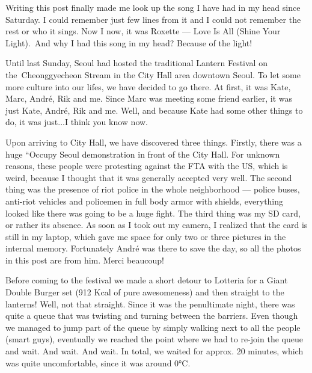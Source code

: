 \begin{post}
	\begin{content}
Writing this post finally made me look up the song I have had in my head since Saturday. I could remember just few lines from it and I could not remember the rest or who it sings. Now I now, it was Roxette — Love Is All (Shine Your Light). And why I had this song in my head? Because of the light!

\begin{figure}[h]
\centering
{}
\end{figure}

Until last Sunday, Seoul had hosted the traditional Lantern Festival on the Cheonggyecheon Stream in the City Hall area downtown Seoul. To let some more culture into our lifes, we have decided to go there. At first, it was Kate, Marc, André, Rik and me. Since Marc was meeting some friend earlier, it was just Kate, André, Rik and me. Well, and because Kate had some other things to do, it was just...I think you know now.

Upon arriving to City Hall, we have discovered three things. Firstly, there was a huge ``Occupy Seoul demonstration in front of the City Hall. For unknown reasons, these people were protesting against the FTA with the US, which is weird, because I thought that it was generally accepted very well. The second thing was the presence of riot police in the whole neighborhood — police buses, anti-riot vehicles and policemen in full body armor with shields, everything looked like there was going to be a huge fight. The third thing was my SD card, or rather its absence. As soon as I took out my camera, I realized that the card is still in my laptop, which gave me space for only two or three pictures in the internal memory. Fortunately André was there to save the day, so all the photos in this post are from him. Merci beaucoup!

Before coming to the festival we made a short detour to Lotteria for a Giant Double Burger set (912 Kcal of pure awesomeness) and then straight to the lanterns! Well, not that straight. Since it was the penultimate night, there was quite a queue that was twisting and turning between the barriers. Even though we managed to jump part of the queue by simply walking next to all the people (smart guys), eventually we reached the point where we had to re-join the queue and wait. And wait. And wait. In total, we waited for approx. 20 minutes, which was quite uncomfortable, since it was around 0°C.


\end{content}
\end{post}

